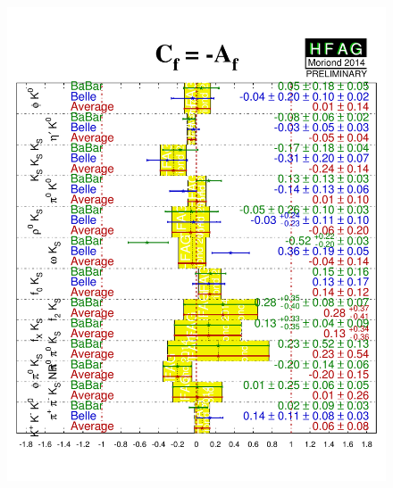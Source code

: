 \begin{figure}[htb]
\begin{center}
{      \includegraphics{figures/cp_uta/sPengC_CP}
    }
    \\
\end{center}
\end{figure}
